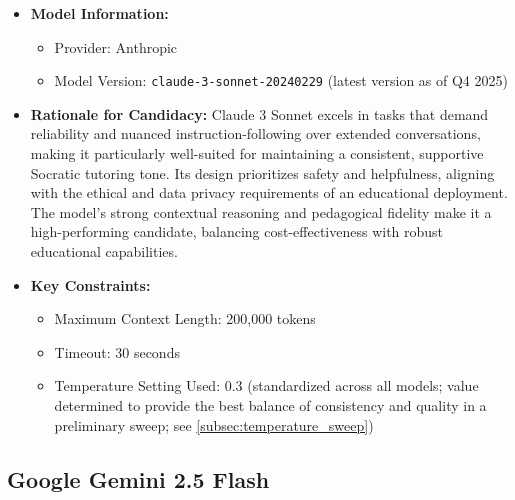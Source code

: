 \begin{itemize}
    \item \textbf{Model Information:} 
        \begin{itemize}
            \item Provider: Anthropic
            \item Model Version: \verb|claude-3-sonnet-20240229| (latest version as of Q4 2025)
        \end{itemize}
    \item \textbf{Rationale for Candidacy:} 
        Claude 3 Sonnet excels in tasks that demand reliability and nuanced instruction-following over extended conversations, making it particularly well-suited for maintaining a consistent, supportive Socratic tutoring tone. Its design prioritizes safety and helpfulness, aligning with the ethical and data privacy requirements of an educational deployment. The model's strong contextual reasoning and pedagogical fidelity make it a high-performing candidate, balancing cost-effectiveness with robust educational capabilities.
    \item \textbf{Key Constraints:}
        \begin{itemize}
            \item Maximum Context Length: 200,000 tokens
            \item Timeout: 30 seconds
            \item Temperature Setting Used: 0.3 (standardized across all models; value determined to provide the best balance of consistency and quality in a preliminary sweep; see \cref{subsec:temperature_sweep})
        \end{itemize}
\end{itemize}

\subsection{Google Gemini 2.5 Flash}
\label{sec:model_gemini2_5_flash}

